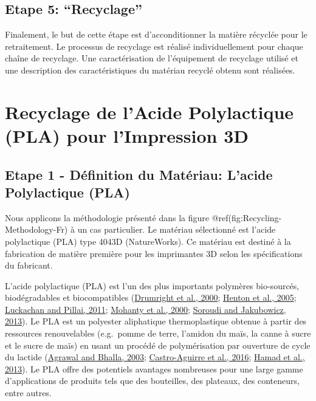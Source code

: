 \documentclass[
]{article}
\begin{document}
\hypertarget{Step5}{%
\subsection{Etape 5: ``Recyclage''}\label{Step5}}

Finalement, le but de cette étape est d'acconditionner la matière
récyclée pour le retraitement. Le processus de recyclage est réalisé
individuellement pour chaque chaîne de recyclage. Une caractérisation de
l'équipement de recyclage utilisé et une description des
caractéristiques du matériau recyclé obtenu sont réalisées.

\hypertarget{recyclage-de-lacide-polylactique-pla-pour-limpression-3d}{%
\section{Recyclage de l'Acide Polylactique (PLA) pour l'Impression
3D}\label{recyclage-de-lacide-polylactique-pla-pour-limpression-3d}}

\hypertarget{etape-1---duxe9finition-du-matuxe9riau-lacide-polylactique-pla}{%
\subsection{Etape 1 - Définition du Matériau: L'acide Polylactique
(PLA)}\label{etape-1---duxe9finition-du-matuxe9riau-lacide-polylactique-pla}}

Nous applicons la méthodologie présenté dans la figure
@ref(fig:Recycling-Methodology-Fr) à un cas particulier. Le matériau
sélectionné est l'acide polylactique (PLA) type 4043D (NatureWorks). Ce
matériau est destiné à la fabrication de matière première pour les
imprimantes 3D selon les spécifications du fabricant.

L'acide polylactique (PLA) est l'un des plus importants polymères
bio-sourcés, biodégradables et biocompatibles
(\protect\hyperlink{ref-Drumright2000}{Drumright et al., 2000};
\protect\hyperlink{ref-Henton2005}{Henton et al., 2005};
\protect\hyperlink{ref-Luckachan2011}{Luckachan and Pillai, 2011};
\protect\hyperlink{ref-Mohanty2000}{Mohanty et al., 2000};
\protect\hyperlink{ref-Soroudi2013}{Soroudi and Jakubowicz, 2013}). Le
PLA est un polyester aliphatique thermoplastique obtenue à partir des
ressources renouvelables (e.g.~pomme de terre, l'amidon du maïs, la
canne à sucre et le sucre de maïs) en usant un procédé de polymérisation
par ouverture de cycle du lactide
(\protect\hyperlink{ref-Agrawal2003}{Agrawal and Bhalla, 2003};
\protect\hyperlink{ref-Castro-Aguirre2016}{Castro-Aguirre et al., 2016};
\protect\hyperlink{ref-Hamad2013}{Hamad et al., 2013}). Le PLA offre des
potentiels avantages nombreuses pour une large gamme d'applications de
produits tels que des bouteilles, des plateaux, des conteneurs, entre
autres.
\end{document}
